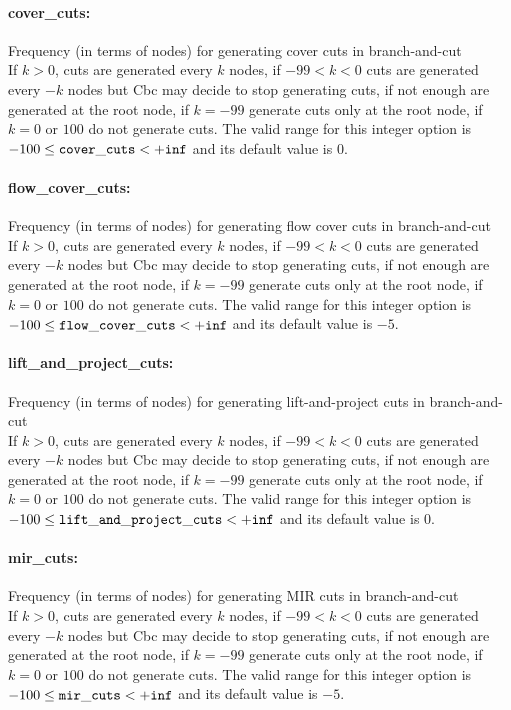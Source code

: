 \paragraph{cover\_cuts:}\label{opt:cover_cuts} Frequency (in terms of nodes) for generating cover cuts in branch-and-cut \\
 If $k > 0$, cuts are generated every $k$ nodes, if $-99 < k < 0$ cuts are generated every $-k$ nodes but Cbc may decide to stop generating cuts, if not enough are generated at the root node, if $k=-99$ generate cuts only at the root node, if $k=0$ or $100$ do not generate cuts. The valid range for this integer option is
$-100 \le {\tt cover\_cuts } <  {\tt +inf}$
and its default value is $0$.


\paragraph{flow\_cover\_cuts:}\label{opt:flow_cover_cuts} Frequency (in terms of nodes) for generating flow cover cuts in branch-and-cut \\
 If $k > 0$, cuts are generated every $k$ nodes, if $-99 < k < 0$ cuts are generated every $-k$ nodes but Cbc may decide to stop generating cuts, if not enough are generated at the root node, if $k=-99$ generate cuts only at the root node, if $k=0$ or $100$ do not generate cuts. The valid range for this integer option is
$-100 \le {\tt flow\_cover\_cuts } <  {\tt +inf}$
and its default value is $-5$.


\paragraph{lift\_and\_project\_cuts:}\label{opt:lift_and_project_cuts} Frequency (in terms of nodes) for generating lift-and-project cuts in branch-and-cut \\
 If $k > 0$, cuts are generated every $k$ nodes, if $-99 < k < 0$ cuts are generated every $-k$ nodes but Cbc may decide to stop generating cuts, if not enough are generated at the root node, if $k=-99$ generate cuts only at the root node, if $k=0$ or $100$ do not generate cuts. The valid range for this integer option is
$-100 \le {\tt lift\_and\_project\_cuts } <  {\tt +inf}$
and its default value is $0$.


\paragraph{mir\_cuts:}\label{opt:mir_cuts} Frequency (in terms of nodes) for generating MIR cuts in branch-and-cut \\
 If $k > 0$, cuts are generated every $k$ nodes, if $-99 < k < 0$ cuts are generated every $-k$ nodes but Cbc may decide to stop generating cuts, if not enough are generated at the root node, if $k=-99$ generate cuts only at the root node, if $k=0$ or $100$ do not generate cuts. The valid range for this integer option is
$-100 \le {\tt mir\_cuts } <  {\tt +inf}$
and its default value is $-5$.


